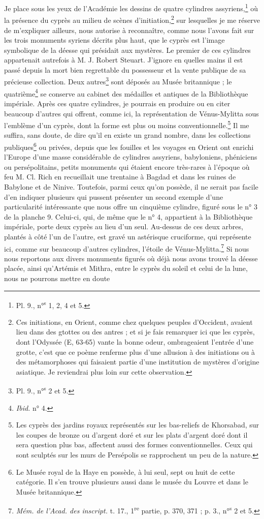 \documentclass{article}
\begin{document}
Je place sous les yeux de l'Académie les dessins de quatre cylindres assyriens,\footnote{Pl. 9., n°\textsuperscript{s} 1, 2, 4 et 5.} où la présence du cyprès au milieu de scènes d'initiation,\footnote{Ces initiations, en Orient, comme chez quelques peuples d'Occident, avaient lieu dans des gtottes ou des antres ; et si je fais remarquer ici que les cyprès, dont l'Odyssée (E, 63-65) vante la bonne odeur, ombrageaient l'entrée d'une grotte, c'est que ce poème renferme plus d'une allusion à des initiations ou à des métamorphoses qui faisaient partie d'une institution de mystères d'origine asiatique. Je reviendrai plus loin sur cette observation.} sur lesquelles je me réserve de m'expliquer ailleurs, nous autorise à reconnaître, comme nous l'avons fait sur les trois monuments syriens décrits plus haut, que le cyprès est l'image symbolique de la déesse qui présidait aux mystères. Le premier de ces cylindres appartenait autrefois à M. J. Robert Steuart. J'ignore en quelles mains il est passé depuis la mort bien regrettable du possesseur et la vente publique de sa précieuse collection. Deux autres\footnote{Pl. 9., n°\textsuperscript{s} 2 et 5.} sont déposés au Musée britannique ; le quatrième\footnote{\emph{Ibid.} n° 4.} se conserve au cabinet des médailles et antiques de la Bibliothèque impériale. Après ces quatre cylindres, je pourrais en produire ou en citer beaucoup d'autres qui offrent, comme ici, la représentation de Vénus-Mylitta sous l'emblème d'un cyprès, dont la forme est plus ou moins conventionnelle.\footnote{Les cyprès des jardins royaux représentés sur les bas-reliefs de Khorsabad, sur les coupes de bronze ou d'argent doré et sur les plats d'argent doré dont il sera question plus bas, affectent aussi des formes conventionnelles. Ceux qui sont sculptés sur les murs de Persépolis se rapprochent un peu de la nature.} Il me suffira, sans doute, de dire qu'il en existe un grand nombre, dans les collections publiques\footnote{Le Musée royal de la Haye en possède, à lui seul, sept ou huit de cette catégorie. Il s'en trouve plusieurs aussi dans le musée du Louvre et dans le Musée britannique.} ou privées, depuis que les fouilles et les voyages en Orient ont enrichi l'Europe d'une masse considérable de cylindres assyriens, babyloniens, phéniciens ou persépolitains, petits monuments qui étaient encore très-rares à l'époque où feu M. Cl. Rich en recueillait une trentaine à Bagdad et dans les ruines de Babylone et de Ninive. Toutefois, parmi ceux qu'on possède, il ne serait pas facile d'en indiquer plusieurs qui pussent présenter un second exemple d'une particularité intéressante que nous offre un cinquième cylindre, figuré sous le n° 3 de la planche 9. Celui-ci, qui, de même que le n° 4, appartient à la Bibliothèque impériale, porte deux cyprès au lieu d'un seul. Au-dessus de ces deux arbres, plantés à côté l'un de l'autre, est gravé un astérisque cruciforme, qui représente ici, comme sur beaucoup d'autres cylindres, l'étoile de Vénus-Mylitta.\footnote{\emph{Mém. de l'Acad. des inscript.} t. 17., 1\textsuperscript{re} partie, p. 370, 371 ; p. 3., n°\textsuperscript{s} 2 et 5.} Si nous nous reportons aux divers monuments figurés où déjà nous avons trouvé la déesse placée, ainsi qu'Artémis et Mithra, entre le cyprès du soleil et celui de la lune, nous ne pourrons mettre en doute 
\end{document}

